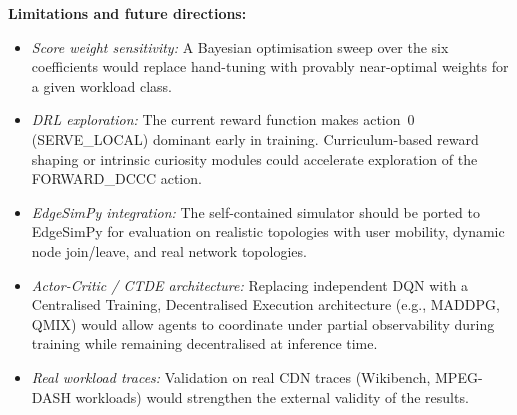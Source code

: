 \documentclass[12pt,a4paper]{report}
\begin{document}
\textbf{Limitations and future directions:}
\begin{itemize}
  \item \textit{Score weight sensitivity:} A Bayesian optimisation sweep over the six
        coefficients would replace hand-tuning with provably near-optimal weights for a given
        workload class.
  \item \textit{DRL exploration:} The current reward function makes action~0 (SERVE\_LOCAL)
        dominant early in training. Curriculum-based reward shaping or intrinsic curiosity
        modules could accelerate exploration of the FORWARD\_DCCC action.
  \item \textit{EdgeSimPy integration:} The self-contained simulator should be ported to
        EdgeSimPy for evaluation on realistic topologies with user mobility, dynamic node
        join/leave, and real network topologies.
  \item \textit{Actor-Critic / CTDE architecture:} Replacing independent DQN with a
        Centralised Training, Decentralised Execution architecture (e.g., MADDPG, QMIX)
        would allow agents to coordinate under partial observability during training while
        remaining decentralised at inference time.
  \item \textit{Real workload traces:} Validation on real CDN traces (Wikibench,
        MPEG-DASH workloads) would strengthen the external validity of the results.
\end{itemize}

\clearpage
\end{document}

